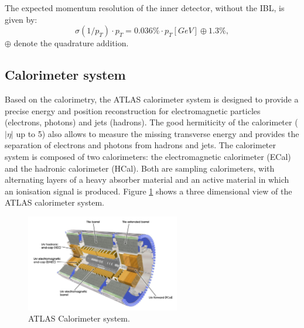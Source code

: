 The expected momentum resolution of the inner detector, without the IBL, is given by:
\begin{equation}
    \sigma(1/p_T)\cdot p_T = 0.036\%\cdot p_T [GeV] \oplus 1.3\%,
\end{equation}
$\oplus$ denote the quadrature addition.
\subsection{Calorimeter system}
\label{chap2:ATLAS:Calo}

Based on the calorimetry, the ATLAS calorimeter system is designed to provide a precise energy and position reconstruction for electromagnetic particles (electrons, photons) and jets (hadrons). The good hermiticity of the calorimeter ($|\eta|$ up to 5) also allows to measure the missing transverse energy and provides the separation of electrons and photons from hadrons and jets. The calorimeter system is composed of two calorimeters: the electromagnetic calorimeter (ECal) and the hadronic calorimeter (HCal). Both are sampling calorimeters, with alternating layers of a heavy absorber material and an active material in which an ionisation signal is produced. Figure \ref{fig:chap2:ATLAS:Calo} shows a three dimensional view of the ATLAS calorimeter system.
\begin{figure}[ht]
    \centering
    \includegraphics[width=0.6\textwidth]{Ch2/Img/Calo.png}
    \caption{ATLAS Calorimeter system.}
    \label{fig:chap2:ATLAS:Calo}
\end{figure}

